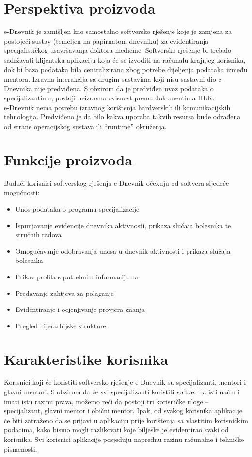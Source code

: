 \documentclass{scrreprt}
\begin{document}
\section{Perspektiva proizvoda}
e-Dnevnik je zamišljen kao samostalno softversko rješenje koje je zamjena za postojeći sustav (temeljen na papirnatom dnevniku) za evidentiranja specijalističkog usavršavanja doktora medicine. Softversko rješenje bi trebalo sadržavati klijentsku aplikaciju koja će se izvoditi na računalu krajnjeg korisnika, dok bi baza podataka bila centralizirana zbog potrebe dijeljenja podataka između mentora. Izravna interakcija sa drugim sustavima koji nisu sastavni dio e-Dnevnika nije predviđena. S obzirom da je predviđen uvoz podataka o specijalizantima, postoji neizravna ovisnost prema dokumentima HLK.\\
e-Dnevnik nema potrebu izravnog korištenja hardverskih ili komunikacijskih tehnologija. Predviđeno je da bilo kakva uporaba takvih resursa bude odrađena od strane operacijskog sustava ili “runtime” okruženja.

\section{Funkcije proizvoda}
Budući korisnici softverskog rješenja e-Dnevnik očekuju od softvera sljedeće mogućnosti:\\
\begin{itemize}
    \item Unos podataka o programu specijalizacije
    \item Ispunjavanje evidencije dnevnika aktivnosti, prikaza slučaja bolesnika te stručnih radova
    \item Omogućavanje odobravanja unosa u dnevnik aktivnosti i prikaza slučaja bolesnika
    \item Prikaz profila s potrebnim informacijama
    \item Predavanje zahtjeva za polaganje
    \item Evidentiranje i ocjenjivanje provjera znanja
    \item Pregled hijerarhijske strukture
\end{itemize}


\section{Karakteristike korisnika}
Korisnici koji će koristiti softversko rješenje e-Dnevnik su specijalizanti, mentori i glavni mentori. S obzirom da će svi specijalizanti koristiti softver na isti način i imati istu razinu prava, možemo reći da postoji tri korisničke uloge – specijalizant, glavni mentor i obični mentor. Ipak, od svakog korisnika aplikacije će biti zatraženo da se prijavi u aplikaciju prije korištenja sa vlastitim korisničkim podacima, kako bismo mogli razlikovati koje bilješke je evidentirao svaki od korisnika. Svi korisnici aplikacije posjeduju naprednu razinu računalne i tehničke pismenosti.
\end{document}
